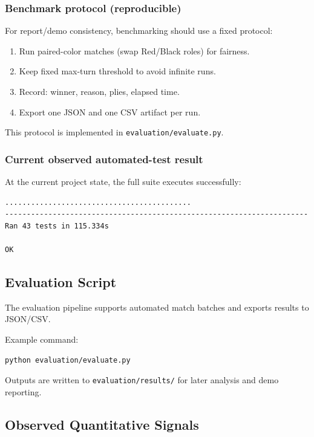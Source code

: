 \documentclass[a4paper,12pt]{article}
\begin{document}
\subsubsection{Benchmark protocol (reproducible)}

For report/demo consistency, benchmarking should use a fixed protocol:
\begin{enumerate}
  \item Run paired-color matches (swap Red/Black roles) for fairness.
  \item Keep fixed max-turn threshold to avoid infinite runs.
  \item Record: winner, reason, plies, elapsed time.
  \item Export one JSON and one CSV artifact per run.
\end{enumerate}

This protocol is implemented in \texttt{evaluation/evaluate.py}.

\subsubsection{Current observed automated-test result}
At the current project state, the full suite executes successfully:
\begin{lstlisting}[language={}]
...........................................
----------------------------------------------------------------------
Ran 43 tests in 115.334s

OK
\end{lstlisting}

\subsection{Evaluation Script}

The evaluation pipeline supports automated match batches and exports results to JSON/CSV\@.

Example command:
\begin{lstlisting}[language=bash, caption={Run evaluation script}]
python evaluation/evaluate.py
\end{lstlisting}

Outputs are written to \texttt{evaluation/results/} for later analysis and demo reporting.

\subsection{Observed Quantitative Signals}
\end{document}
